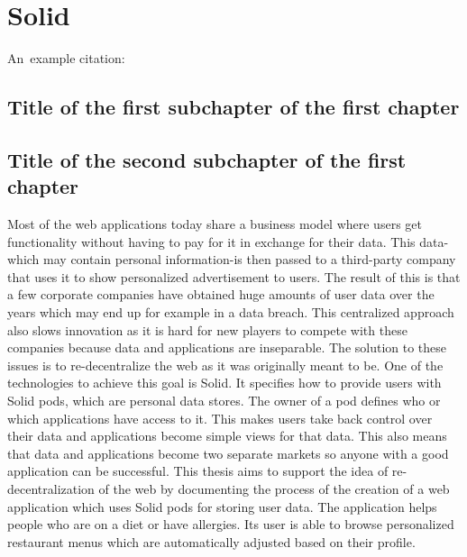 \chapter{Solid}

An~example citation: \cite{Andel07}

\section{Title of the first subchapter of the first chapter}

\section{Title of the second subchapter of the first chapter}

Most of the web applications today share a business model where users get functionality without having to pay for it in exchange for their data.
This data-which may contain personal information-is then passed to a third-party company that uses it to show personalized advertisement to users. 
The result of this is that a few corporate companies have obtained huge amounts of user data over the years which may end up for example in a data breach. 
This centralized approach also slows innovation as it is hard for new players to compete with these companies because data and applications are inseparable. 
The solution to these issues is to re-decentralize the web as it was originally meant to be. 
One of the technologies to achieve this goal is Solid. 
It specifies how to provide users with Solid pods, which are personal data stores. 
The owner of a pod defines who or which applications have access to it. 
This makes users take back control over their data and applications become simple views for that data. 
This also means that data and applications become two separate markets so anyone with a good application can be successful. 
This thesis aims to support the idea of re-decentralization of the web by documenting the process of the creation of a web application which uses Solid pods for storing user data. 
The application helps people who are on a diet or have allergies. 
Its user is able to browse personalized restaurant menus which are automatically adjusted based on their profile.